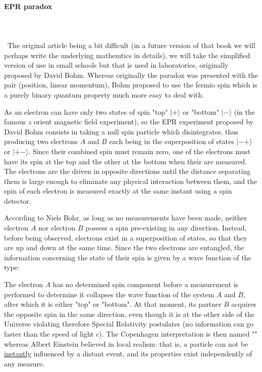 	\paragraph{EPR paradox}\mbox{}\\\\\
	The original article being a bit difficult (in a future version of that book we will perhaps write the underlying mathemtics in details), we will take the simplified version of use in small schools but that is used in laboratories, originally proposed by David Bohm. Whereas originally the paradox was presented with the pair (position, linear momentum), Bohm proposed to use the fermio spin which is a purely binary quantum property much more easy to deal with.
	
	As an electron can have only two states of spin "top" $|+\rangle$ or "bottom" $|-\rangle$ (in the famous $z$ orient magnetic field experiment), so the EPR experiment proposed by David Bohm consists in taking a null spin particle which disintegrates, thus producing two electrons $A$ and $B$ each being in the superposition of states $|-+\rangle$ or $|+-\rangle$. Since their combined spin must remain zero, one of the electrons must have its spin at the top and the other at the bottom when their are measured. The electrons are the driven in opposite directions until the distance separating them is large enough to eliminate any physical interaction between them, and the spin of each electron is measured exactly at the same instant using a spin detector.
	
	According to Niels Bohr, as long as no measurements have been made, neither electron $A$ nor electron $B$ possess a spin pre-existing in any direction. Instead, before being observed, electrons exist in a superposition of states, so that they are up and down at the same time. Since the two electrons are entangled, the information concerning the state of their spin is given by a wave function of the type:
	
	The electron $A$ has no determined spin component before a measurement is performed to determine it collapses the wave function of the system $A$ and $B$, after which it is either "top" or "bottom". At that moment, its partner $B$ acquires the opposite spin in the same direction, even though it is at the other side of the Universe violating therefore Special Relativity postulates (no information can go faster than the speed of light $c$). The Copenhagen interpretation is then named "" whereas Albert Einstein believed in local realism: that is, a particle can not be \underline{instantly} influenced by a distant event, and its properties exist independently of any measure.
	
